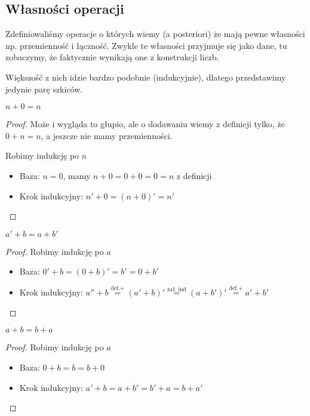 \subsection{Własności operacji}

Zdefiniowaliśmy operacje o których wiemy (a posteriori) że mają pewne własności np. przemienność i łączność. Zwykle te własności przyjmuje się jako dane, tu zobaczymy, że faktycznie wynikają one z konstrukcji liczb.

Większość z nich idzie bardzo podobnie (indukcyjnie), dlatego przedstawimy jedynie parę szkiców.

\begin{lemma}
    \( n + 0 = n \)
\end{lemma}
\begin{proof}
    Może i wygląda to głupio, ale o dodawaniu wiemy z definicji tylko, że \( 0 + n = n \), a jeszcze nie mamy przemienności.
    
    Robimy indukcję po \( n \)
    \begin{itemize}
        \item Baza: \( n = 0 \), mamy \( n + 0 = 0 + 0 = 0 = n \) z definicji
        \item Krok indukcyjny: \( n' + 0 = (n + 0)' = n' \)
    \end{itemize}
\end{proof}

\begin{lemma}
    \( a' + b = a + b' \)
\end{lemma}
\begin{proof}
    Robimy indukcję po \( a \)
    \begin{itemize}
        \item Baza: \( 0' + b = (0 + b)' = b' = 0 + b' \)
        \item Krok indukcyjny: \( a'' + b \stackrel{\text{def.} +}{=} (a' + b)' \stackrel{\text{zał. ind}}{=} (a + b')' \stackrel{\text{def.} +}{=} a' + b' \)
    \end{itemize}
\end{proof}


\begin{theorem}
    \( a + b = b + a \)
\end{theorem}
\begin{proof}
    Robimy indukcję po \( a \)
    \begin{itemize}
        \item Baza: \( 0 + b = b = b + 0 \)
        \item Krok indukcyjny: \( a' + b = a + b' = b' + a = b + a' \)
    \end{itemize}
\end{proof}

